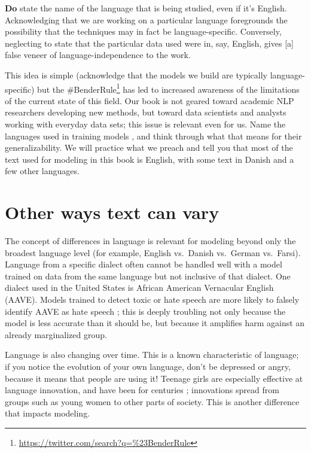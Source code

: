 \documentclass[
]{krantz}
\DeclareRobustCommand{\href}[2]{#2\footnote{\url{#1}}}
\renewenvironment{quote}{\begin{VF}}{\end{VF}}
\renewcommand{\href}[2]{#2\footnote{\url{#1}}}
\begin{document}
\begin{quote}
\textbf{Do} state the name of the language that is being studied, even if it's English. Acknowledging that we are working on a particular language foregrounds the possibility that the techniques may in fact be language-specific. Conversely, neglecting to state that the particular data used were in, say, English, gives {[}a{]} false veneer of language-independence to the work.
\end{quote}

This idea is simple (acknowledge that the models we build are typically language-specific) but the \href{https://twitter.com/search?q=\%23BenderRule}{\#BenderRule} has led to increased awareness of the limitations of the current state of this field. Our book is not geared toward academic NLP researchers developing new methods, but toward data scientists and analysts working with everyday data sets; this issue is relevant even for us. Name the languages used in training models \citep{bender2019rule}, and think through what that means for their generalizability. We will practice what we preach and tell you that most of the text used for modeling in this book is English, with some text in Danish and a few other languages.

\hypertarget{other-ways-text-can-vary}{%
\section{Other ways text can vary}\label{other-ways-text-can-vary}}

The concept of differences in language is relevant for modeling beyond only the broadest language level (for example, English vs.~Danish vs.~German vs.~Farsi). Language from a specific dialect often cannot be handled well with a model trained on data from the same language but not inclusive of that dialect. One dialect used in the United States is African American Vernacular English (AAVE). Models trained to detect toxic or hate speech are more likely to falsely identify AAVE as hate speech \citep{Sap19}; this is deeply troubling not only because the model is less accurate than it should be, but because it amplifies harm against an already marginalized group.

Language is also changing over time. This is a known characteristic of language; if you notice the evolution of your own language, don't be depressed or angry, because it means that people are using it! Teenage girls are especially effective at language innovation, and have been for centuries \citep{McCulloch15}; innovations spread from groups such as young women to other parts of society. This is another difference that impacts modeling.
\end{document}
